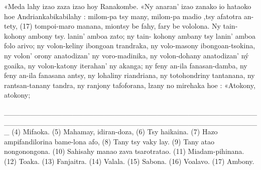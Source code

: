 «Meda lahy izao zaza izao hoy Ranakombe. «Ny anaran' izao
zanako io hataoko hoe Andriankabikabilahy : milom-pa tsy many, milom-pa
madio ,tsy afatotra an-tety, (17) tompoi-maro manana, miontsy be fahy,
fary be vololona. Ny tain-kohony ambony tsy. lanin' amboa zato; ny tain-
kohony ambany tsy lanin' amboa folo arivo; ny volon-keliny ibongoan
trandraka, ny volo-masony ibongoan-tsokina, ny volon' orony anatodizan'
ny voro-madinika, ny volon-dohany anatodizan' ný goaika, ny volon-katony
iterahan' ny akanga; ny feny an-ila fanasan-damba, ny feny an-ila fanasana
antsy, ny lohaliny riandriana, ny totohondriny tantanana, ny rantsan-tanany
tandra, ny ranjony tafoforana, lzany no mirehaka hoe : «Atokony, atokony;

_________________________________________________________________________________________________
(4) Mifaoka. 
(5) Mahamay, idiran-doza, 
(6) Tsy haikaina. 
(7) Hazo ampifandilorina bame-lona afo, 
(8) Tany tsy vaky lay. 
(9) Tany atao nongonongona. 
(10) Sahisahy manao zava tsarotratao. 
(11) Miadam-pihinana. 
(12) Toaka. 
(13) Fanjaitra. 
(14) Valala. 
(15) Sabona.
(16) Voalavo. 
(17) Ambony.